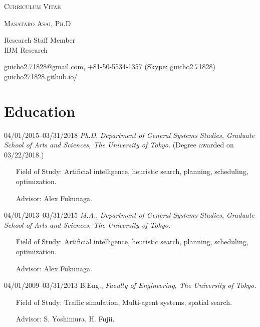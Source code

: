 \documentclass[letterpaper,11pt]{article}
\begin{document}
\pagestyle{empty}

\begin{center}
{\huge\textsc{Curriculum Vitae}}
\vspace{0.7\baselineskip}

{\Large\textsc{Masataro Asai, Ph.D}}
\vspace{0.5\baselineskip}

\small
{
Research Staff Member\\
IBM Research
}



 guicho2.71828@gmail.com, +81-50-5534-1357 (Skype: guicho2.71828) \url{guicho271828.github.io/}
\end{center}

\section{Education}

\begin{CV}
 \item[04/01/2015--03/31/2018] \textit{Ph.D}, \emph{Department of General Systems Studies, Graduate School of Arts and Sciences, The University of Tokyo.} (Degree awarded on 03/22/2018.)
 \begin{itemize}
 \item[Field of Study:]       Artificial intelligence, heuristic search, planning, scheduling, optimization.
 \item[Advisor:]              Alex Fukunaga.
 \end{itemize}

 \item[04/01/2013--03/31/2015] \textit{M.A.}, \emph{Department of General Systems Studies, Graduate School of Arts and Sciences, The University of Tokyo.}
 \begin{itemize}
 \item[Field of Study:]       Artificial intelligence, heuristic search, planning, scheduling, optimization.
 \item[Advisor:]              Alex Fukunaga.
 \end{itemize}

 \item[04/01/2009--03/31/2013] B.Eng., \emph{Faculty of Engineering, The University of Tokyo.}
 \begin{itemize}
 \item[Field of Study:]       Traffic simulation, Multi-agent systems, spatial search.
 \item[Advisor:]              S. Yoshimura. H. Fujii.
 \end{itemize}
\end{CV}
\end{document}
